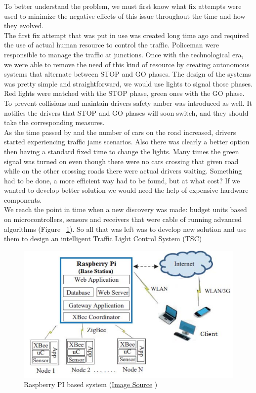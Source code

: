 \documentclass[17pt]{report}
\begin{document}
\indent \indent
To better understand the problem, we must first know what fix attempts 
were used to minimize the negative effects of this issue throughout
the time and how they evolved.\\
\indent \indent
The first fix attempt that was put in use was created long time ago and required
the use of actual human resource to control the traffic. Policeman were
responsible to manage the traffic at junctions. Once with the  technological
era, we were able to remove the need of this kind of resource by creating
autonomous systems that alternate between STOP and GO phases. The design of the 
systems was pretty simple and straightforward, we would use lights to signal 
those phases. Red lights were matched with the STOP phase, green ones with the
GO phase. To prevent collisions and maintain drivers safety amber was
introduced as well. It notifies the drivers that STOP and GO phases will soon
switch, and they should take the corresponding measures.\\
\indent \indent
As the time passed by and the number of cars on the road increased, drivers 
started experiencing traffic jams scenarios. Also there was clearly a better
option then having a standard fixed time to change the lights. Many times
the green signal was turned on even though there were no cars crossing that
given road while on the other crossing roads there were actual drivers waiting.
Something had to be done, a more efficient way had to be found, but at what
cost? If we wanted to develop better solution we would need the help of
expensive hardware components.\\
\indent \indent
We reach the point in time when a new discovery was made: budget units based
on  microcontrollers, sensors and receivers \cite{Deshmukh2016} that were
cable of running advanced algorithms (Figure ~\ref{fig:PI}). So all that was left was to develop 
new solution and use them to design an intelligent Traffic Light Control
System (TSC)\\
\begin{figure}[h!]
    \includegraphics[width=\textwidth]{PiSystems.png}
    \caption{Raspberry PI based system 
    (\href{https://www.semanticscholar.org/paper/A-low-cost-environment-monitoring-system-using-Pi-Deshmukh-Shinde/e05a1fb72b08803d40dc06fa202241636fb82c21}{Image Source} \textcopyright ) }
    \label{fig:PI}
\end{figure}
\end{document}
